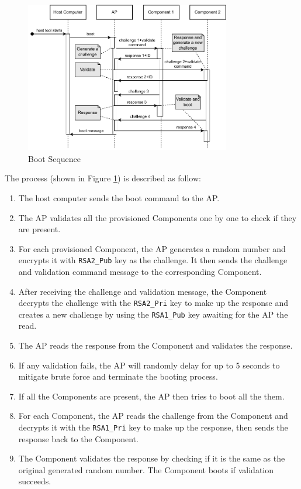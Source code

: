 \documentclass[11pt,oneside,onecolumn,letterpaper]{article}
\begin{document}
\begin{figure}[h]
	\centering
	\includegraphics[width=0.8\textwidth]{pics/boot.pdf}
	\caption{Boot Sequence}
	\label{fig:functionality_boot}
\end{figure}

The process (shown in Figure \ref{fig:functionality_boot}) is described as follow:
\begin{enumerate}
	\item The host computer sends the boot command to the AP.
	\item The AP validates all the provisioned Components one by one to check if they are present.
	\item For each provisioned Component,
	the AP generates a random number and encrypts it with \texttt{RSA2\_Pub} key as the challenge.
	It then sends the challenge and validation command message to the corresponding Component.
	\item After receiving the challenge and validation message,
	the Component decrypts the challenge with the \texttt{RSA2\_Pri} key to make up the response and creates a new challenge by using the \texttt{RSA1\_Pub} key awaiting for the AP the read.
	\item The AP reads the response from the Component and validates the response.
	\item If any validation fails,
	the AP will randomly delay for up to 5 seconds to mitigate brute force and terminate the booting process.
	\item If all the Components are present,
	the AP then tries to boot all the them.
	\item For each Component,
	the AP reads the challenge from the Component and decrypts it with the \texttt{RSA1\_Pri} key to make up the response,
	then sends the response back to the Component.
	\item The Component validates the response by checking if it is the same as the original generated random number.
	The Component boots if validation succeeds.
\end{enumerate}
\end{document}

